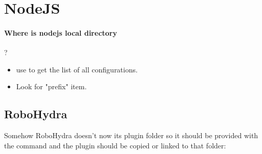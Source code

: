 \section {NodeJS}
\paragraph{Where is nodejs local directory}?\newline
\begin{itemize}
	\item use  to get the list of all configurations.
	\item Look for "prefix" item.
\end{itemize}

\subsection{RoboHydra}
Somehow RoboHydra doesn't now its plugin folder so it should be provided with the command and the plugin should be copied or linked to that folder:

